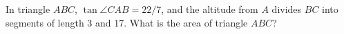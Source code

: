 In triangle $ABC$, $\tan \angle CAB = 22/7$, and the altitude from $A$ divides $BC$ into segments of length 3 and 17.  What is the area of triangle $ABC$?